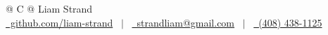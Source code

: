 \documentclass[10pt]{article}
\begin{document}
\pagestyle{empty} 


\begin{tabularx}{\linewidth}{@{} C @{}}
\huge{Liam Strand} \\[5pt]
\href{https://github.com/liam-strand}{\raisebox{-0.05\height}\faGithub\ github.com/liam-strand} \ $|$ \ 
\href{mailto:strandliam@gmail.com}{\raisebox{-0.05\height}\faEnvelope \ strandliam@gmail.com} \ $|$ \ 
\href{tel:+14084381125}{\raisebox{-0.05\height}\faMobile \ (408) 438-1125}
\end{tabularx}

\end{document}
